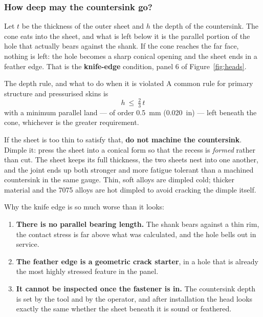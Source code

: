 \documentclass[11pt,a4paper]{article}
\begin{document}
\subsubsection*{How deep may the countersink go?}

Let $t$ be the thickness of the outer sheet and $h$ the depth of the countersink. The cone eats
into the sheet, and what is left below it is the parallel portion of the hole that actually bears
against the shank. If the cone reaches the far face, nothing is left: the hole becomes a sharp
conical opening and the sheet ends in a feather edge. That is the \textbf{knife-edge} condition,
panel 6 of Figure~\ref{fig:heads}.

\begin{keybox}{The depth rule, and what to do when it is violated}
A common rule for primary structure and pressurised skins is
\[
\boxed{\ h \ \le\ \tfrac{2}{3}\,t\ }
\]
with a minimum parallel land --- of order \SI{0.5}{mm} (\SI{0.020}{in}) --- left beneath the cone,
whichever is the greater requirement.

\medskip
If the sheet is too thin to satisfy that, \textbf{do not machine the countersink}. Dimple it:
press the sheet into a conical form so that the recess is \emph{formed} rather than cut. The sheet
keeps its full thickness, the two sheets nest into one another, and the joint ends up both
stronger and more fatigue tolerant than a machined countersink in the same gauge. Thin, soft
alloys are dimpled cold; thicker material and the \num{7075} alloys are hot dimpled to avoid
cracking the dimple itself.
\end{keybox}

\medskip
Why the knife edge is so much worse than it looks:
\begin{enumerate}[leftmargin=*,itemsep=1pt]
\item \textbf{There is no parallel bearing length.} The shank bears against a thin rim, the
  contact stress is far above what was calculated, and the hole bells out in service.
\item \textbf{The feather edge is a geometric crack starter}, in a hole that is already the most
  highly stressed feature in the panel.
\item \textbf{It cannot be inspected once the fastener is in.} The countersink depth is set by the
  tool and by the operator, and after installation the head looks exactly the same whether the
  sheet beneath it is sound or feathered.
\end{enumerate}
\end{document}
